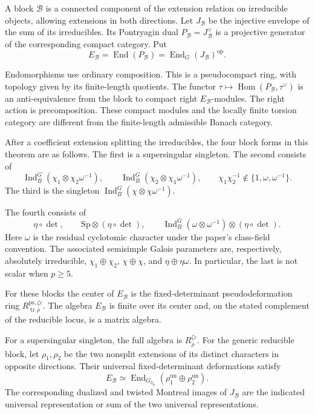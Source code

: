 A block \(\mathcal B\) is a connected component of the extension
relation on irreducible objects, allowing extensions in both
directions. Let \(J_{\mathcal B}\) be the injective envelope
of the sum of its irreducibles. Its Pontryagin dual
\(P_{\mathcal B}=J_{\mathcal B}^{\vee}\) is a projective
generator of the corresponding compact category. Put
\[
 E_{\mathcal B}=\operatorname{End}(P_{\mathcal B})
    =\operatorname{End}_G(J_{\mathcal B})^{\mathrm{op}}.
\]

Endomorphisms use ordinary composition. This is a pseudocompact
ring, with topology given by its finite-length quotients.
The functor \(\tau\mapsto
\operatorname{Hom}(P_{\mathcal B},\tau^\vee)\) is an
anti-equivalence from the block to compact right
\(E_{\mathcal B}\)-modules. The right action is precomposition.
These compact modules and the locally finite torsion category
are different from the finite-length admissible Banach category.

After a coefficient extension splitting the irreducibles, the
four block forms in this theorem are as follows. The first is a
supersingular singleton. The second consists of
\[
 \operatorname{Ind}_B^G(\chi_1\otimes\chi_2\omega^{-1}),
 \qquad
 \operatorname{Ind}_B^G(\chi_2\otimes\chi_1\omega^{-1}),
 \qquad \chi_1\chi_2^{-1}\notin\{1,\omega,\omega^{-1}\}.
\]
The third is the singleton
\(\operatorname{Ind}_B^G(\chi\otimes\chi\omega^{-1})\).

The fourth consists of
\[
 \eta\circ\det,\qquad
 \mathrm{Sp}\otimes(\eta\circ\det),\qquad
 \operatorname{Ind}_B^G(\omega\otimes\omega^{-1})
                    \otimes(\eta\circ\det).
\]
Here \(\omega\) is the residual cyclotomic character under the
paper's class-field convention.
The associated semisimple Galois parameters are, respectively,
absolutely irreducible, \(\chi_1\oplus\chi_2\),
\(\chi\oplus\chi\), and \(\eta\oplus\eta\omega\).
In particular, the last is not scalar when \(p\ge5\).

\begin{theorem}[Pa\v{s}k\={u}nas, Theorems 1.5--1.7]
\label{v4-arith:ic:paskunas}
For these blocks the center of \(E_{\mathcal B}\) is the
fixed-determinant pseudodeformation ring
\(R_{\operatorname{tr}\bar\rho}^{\mathrm{ps},\zeta\varepsilon}\).
The algebra \(E_{\mathcal B}\) is finite over its center and,
on the stated complement of the reducible locus, is a matrix algebra.

For a supersingular singleton, the full algebra is
\(R_{\bar\rho}^{\zeta\varepsilon}\).
For the generic reducible block, let \(\rho_1,\rho_2\) be the
two nonsplit extensions of its distinct characters in opposite
directions. Their universal fixed-determinant deformations satisfy
\[
 E_{\mathcal B}\simeq
 \operatorname{End}_{G_{\mathbb Q_p}}
             (\rho_1^{\mathrm{un}}\oplus\rho_2^{\mathrm{un}}).
\]
The corresponding dualized and twisted Montreal images of
\(J_{\mathcal B}\) are the indicated universal representation
or sum of the two universal representations.
\end{theorem}

